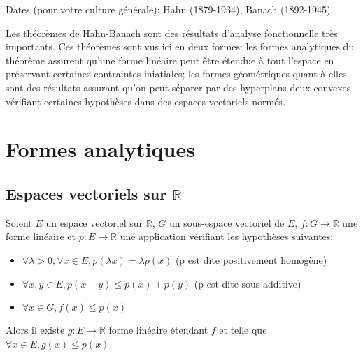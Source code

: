 Dates (pour votre culture générale): Hahn (1879-1934), Banach (1892-1945).

Les théorèmes de Hahn-Banach sont des résultats d'analyse fonctionnelle
très importants. Ces théorèmes sont vus ici en deux formes:
les formes analytiques du théorème assurent qu'une forme linéaire
peut être étendue à tout l'espace en préservant certaines contraintes
iniatiales; les formes géométriques quant à elles sont des résultats
assurant qu'on peut séparer par des hyperplans deux convexes vérifiant
certaines hypothèses dans des espaces vectoriels normés.

\section{Formes analytiques}
\subsection{Espaces vectoriels sur $\mathbb{R}$}

\begin{thm} \label{hb:a1}
Soient $E$ un espace vectoriel sur $\mathbb{R}$, $G$ un sous-espace
vectoriel de $E$, $f: G \to \mathbb{R}$ une forme linéaire
et $p: E\to \mathbb{R}$ une application vérifiant les hypothèses suivantes:
\begin{itemize}
\item $\forall\lambda >0, \forall x \in E, p(\lambda x)=\lambda p(x)$
  (p est dite positivement homogène)
\item $\forall x,y \in E, p(x+y)\leq p(x)+p(y)$
  (p est dite sous-additive)
\item$\forall x\in G, f(x)\leq p(x)$
\end{itemize}
Alors il existe $g:E\to\mathbb{R}$ forme linéaire étendant $f$ et telle
que $\forall x \in E, g(x)\leq p(x)$.
\end{thm}

